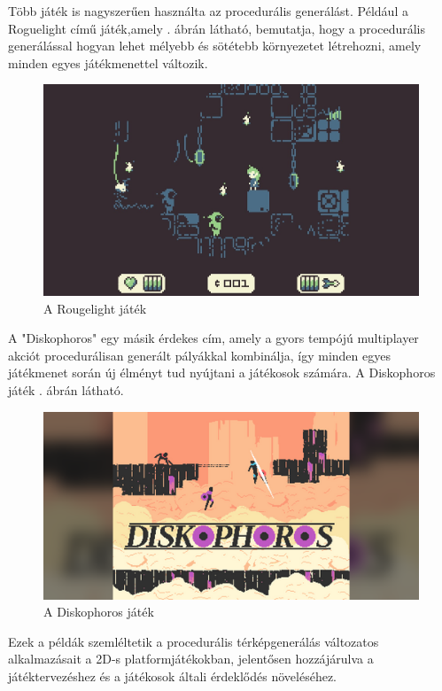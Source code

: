Több játék is nagyszerűen használta az procedurális generálást. Például a Roguelight című játék,amely . ábrán látható, bemutatja, hogy a procedurális generálással hogyan lehet mélyebb és sötétebb környezetet létrehozni, amely minden egyes játékmenettel változik.

\begin{figure}[ht]
\centering
\includegraphics[scale = 0.2]{images/rougelight.jpg}
\caption{A Rougelight játék}
\label{fig:rougelight}
\end{figure}

A "Diskophoros" egy másik érdekes cím, amely a gyors tempójú multiplayer akciót procedurálisan generált pályákkal kombinálja, így minden egyes játékmenet során új élményt tud nyújtani a játékosok számára. A Diskophoros játék . ábrán látható.

\begin{figure}[ht]
\centering
\includegraphics[scale = 0.7]{images/diskophoros.png}
\caption{A Diskophoros játék}
\label{fig:diskophoros}
\end{figure}

Ezek a példák szemléltetik a procedurális térképgenerálás változatos alkalmazásait a 2D-s platformjátékokban, jelentősen hozzájárulva a játéktervezéshez és a játékosok általi érdeklődés növeléséhez.

